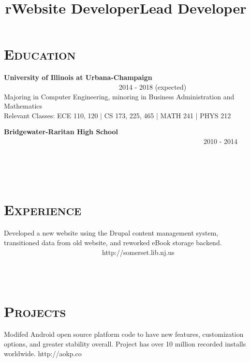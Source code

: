 \begin{resume}
\section{\textsc{Education}}
\textbf{University of Illinois at Urbana-Champaign} \ \ \ \ \ \ \ \ \ \ \ \ \ \ \ \ \ \ \ \ \ \ \ \ \ \ \ \ \ \ \ \ \ \ 2014 - 2018 (expected) \\
Majoring in Computer Engineering, minoring in Business Administration and Mathematics \\
Relevant Classes: ECE 110, 120 | CS 173, 225, 465 | MATH 241 | PHYS 212

\textbf{Bridgewater-Raritan High School} \ \ \ \ \ \ \ \ \ \ \ \ \ \ \ \ \ \ \ \ \ \ \ \ \ \ \ \ \ \ \ \ \ \ \ \ \ \ \ \ \ \ \ \ \ \ \ \ \ \ \ \ \ \ \ \ \ \ \ 2010 - 2014

\begin{formatb}
  \title{r}\\
  \\
  \body\\
\end{formatb}

\section{\textsc{Experience}}

\title{Website Developer}
\begin{position}
Developed a new website using the Drupal content management system, transitioned data from old website, and reworked eBook storage backend. \ \ \ \ \ \ \ \ \ \ \ \ \ \ \ \ \ \ \ \ \ \ \ \ \ \ \ \ \ http://somerset.lib.nj.us
\end{position}

\begin{formatb}
  \\
  \body\\
\end{formatb}

\section{\textsc{Projects}}

\title{Lead Developer}
\begin{position}
Modifed Android open source platform code to have new features, customization options, and greater stability overall. Project has over 10 million recorded installs worldwide. http://aokp.co
\end{position}


\end{resume}
